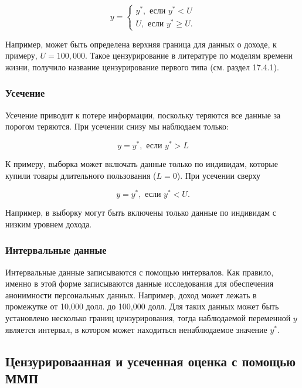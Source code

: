 \begin{equation}
y=
	\begin{cases}
	y^* ,	 \text{ если }y^* <U\\
	U,		\text{ если }y^*  \geq U.
	\end{cases}
\end{equation}

Например, может быть определена верхняя граница для данных о доходе, к примеру, $U=100,000$. Такое цензурирование в литературе по моделям времени жизни, получило название цензурирование первого типа (см. раздел 17.4.1). 


\subsubsection*{Усечение}

Усечение приводит к потере информации, поскольку теряются все данные за порогом теряются. При усечении снизу мы наблюдаем только:

\begin{equation}
y=y^* , \text{ если } y^* >L
\end{equation}

К примеру, выборка может включать данные только по индивидам, которые купили товары длительного пользования ($L=0$). При усечении сверху

\begin{equation}
y=y^* , \text{ если } y^* <U.
\end{equation}

Например, в выборку могут быть включены только данные по индивидам с низким уровнем дохода.

\subsubsection*{Интервальные данные}

Интервальные данные записываются с помощью интервалов. Как правило, именно в этой форме записываются данные исследования для обеспечения анонимности персональных данных. Например, доход может лежать в промежутке от 10,000 долл. до 100,000 долл. Для таких данных может быть установлено несколько границ цензурирования, тогда наблюдаемой переменной $y$ является интервал, в котором может находиться ненаблюдаемое значение $y^* $. 

\subsection{Цензурироваанная и усеченная оценка с помощью ММП}

